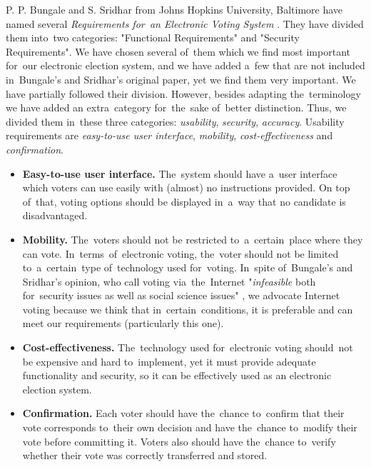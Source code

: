 P. P. Bungale and S. Sridhar from Johns Hopkins University, Baltimore have named several \emph{Requirements for~an Electronic Voting System} \cite{BunSri}. They have divided them into~two categories: "Functional Requirements" and "Security Requirements". We have chosen several of~them which we find most important for~our electronic election system, and we have added a~few that are not included in~Bungale's and Sridhar's original paper, yet we find them very important. We have partially followed their division. However, besides adapting the~terminology we have added an extra~category for~the~sake of~better distinction.  Thus, we divided them in~these three categories: \emph{usability}, \emph{security}, \emph{accuracy}. 
\bigbreak
Usability requirements are \emph{easy-to-use user interface}, \emph{mobility}, \emph{cost-effectiveness} and \emph{confirmation}.
\begin{itemize}
\item \textbf{Easy-to-use user interface.} The~system should have a~user interface which voters can use easily with (almost) no instructions provided. On top of~that, voting options should be displayed in~a~way that no candidate is disadvantaged.
\item \textbf{Mobility.} The~voters should not be restricted to~a~certain~place where they can vote. In~terms~of~electronic voting, the~voter should not be limited to~a~certain~type of~technology used for~voting. In~spite of~Bungale's and Sridhar's opinion, who call voting via~the~Internet "\emph{infeasible} both for~security issues as well as social science issues" \cite{BunSri}, we advocate Internet voting because we think that in~certain~conditions, it is preferable and can meet our requirements (particularly this one).
\item \textbf{Cost-effectiveness.} The~technology used for~electronic voting should~not be expensive and hard to~implement, yet it must provide adequate functionality and security, so it can be effectively used as an electronic election system.
\item \textbf{Confirmation.} Each voter should have the~chance to~confirm that their vote corresponds to~their own decision and have the~chance to~modify their vote before committing it. Voters also should have the~chance to~verify whether their vote was correctly transferred and stored.
\end{itemize}

